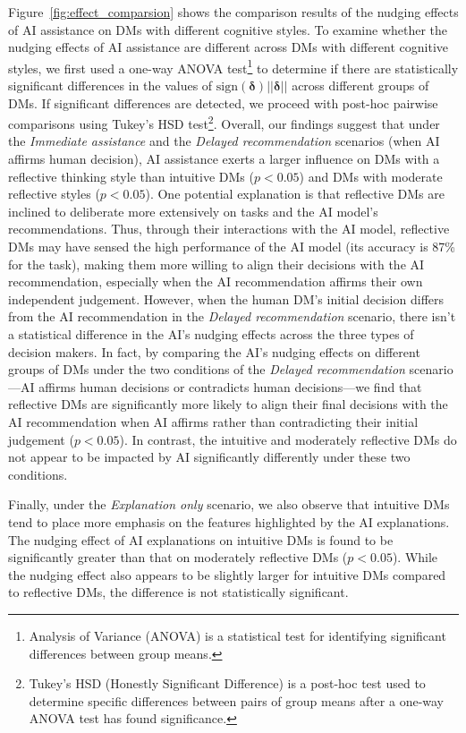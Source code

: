 \documentclass[letterpaper]{article} %
\begin{document}
Figure~\ref{fig:effect_comparsion} shows the comparison results of the nudging effects of AI assistance on DMs with different cognitive styles. To examine whether the nudging effects of AI assistance are different across DMs with different cognitive styles,
we first used a one-way ANOVA test\footnote{Analysis of Variance (ANOVA) is a statistical test for identifying significant differences between group means.} to determine if there are statistically significant differences in the values of $\text{sign}(\bm{\delta})||\bm{\delta}||$ across different groups of DMs. If significant differences are detected, we proceed with post-hoc pairwise comparisons using Tukey's HSD test\footnote{Tukey's HSD (Honestly Significant Difference) is a post-hoc test used to determine specific differences between pairs of group means after a one-way ANOVA test has found significance.}.
Overall, our findings suggest that under the \emph{Immediate assistance} and the \emph{Delayed recommendation} scenarios (when AI affirms human decision), AI assistance exerts a larger influence on DMs with a reflective thinking style than intuitive DMs ($p<0.05$) and DMs with moderate reflective styles ($p<0.05$). One potential explanation is that reflective DMs are inclined to deliberate more extensively on tasks and
the AI model's recommendations.
Thus, through their interactions with the AI model, reflective DMs may have sensed the high performance of the AI model (its accuracy is 87\% for the task), making them more willing to align their decisions with the AI recommendation, especially when the AI recommendation affirms their own independent judgement. However, when the human DM's initial decision differs from the AI recommendation in the \emph{Delayed recommendation} scenario, there isn't a statistical difference in the AI's nudging effects across the three types of decision makers. In fact, by comparing the AI's nudging effects on different groups of DMs under the two conditions of the \emph{Delayed recommendation} scenario---AI affirms human decisions or contradicts human decisions---we find that reflective DMs are significantly more likely to align their final decisions with the AI recommendation when AI affirms rather than contradicting their initial judgement ($p<0.05$). In contrast, the intuitive and moderately reflective DMs do not appear to be impacted by AI significantly differently under these two conditions.


Finally, under the \emph{Explanation only} scenario, we also observe that intuitive DMs tend to place more emphasis on the features highlighted by the AI explanations. The nudging effect of AI explanations on intuitive DMs is found to be significantly greater than that on moderately reflective DMs ($p<0.05$). While the nudging effect also appears to be slightly larger for intuitive DMs compared to reflective DMs, the difference is not statistically significant.
\end{document}
